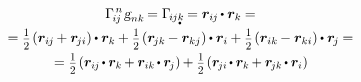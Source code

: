 \begin{otherlanguage}{russian}
\begin{multline}
\Gamma_{\hspace{-0.25ex}i\hspace{-0.1ex}j}^{\hspace{.25ex}n} \hspace{.16ex} \textsl{g}_{nk} \hspace{-0.24ex} = \Gamma_{\hspace{-0.25ex}i\hspace{-0.1ex}j\mathdotbelow{k}} \hspace{-0.2ex} = \bm{r}_{i\hspace{-0.1ex}j} \hspace{-0.2ex} \dotp \bm{r}_k \hspace{-0.1ex} = \\[-0.1em]
%
= \smalldisplaystyleonehalf \hspace{-0.2ex} \left( \bm{r}_{i\hspace{-0.1ex}j} \hspace{-0.16ex} + \bm{r}_{\hspace{-0.2ex}ji} \right) \hspace{-0.1ex} \dotp \bm{r}_k \hspace{-0.1ex}
+ \smalldisplaystyleonehalf \hspace{-0.2ex} \left( \bm{r}_{\hspace{-0.2ex}jk} \hspace{-0.16ex} - \bm{r}_{kj} \right) \hspace{-0.1ex} \dotp \bm{r}_i \hspace{-0.1ex}
+ \smalldisplaystyleonehalf \hspace{-0.2ex} \left( \bm{r}_{ik} \hspace{-0.16ex} - \bm{r}_{ki} \right) \hspace{-0.1ex} \dotp \bm{r}_{\hspace{-0.2ex}j} \hspace{-0.1ex} = \\[-0.12em]
%
= \smalldisplaystyleonehalf \hspace{-0.2ex} \left( \scalebox{0.96}[1]{$\bm{r}_{i\hspace{-0.1ex}j} \hspace{-0.2ex} \dotp \bm{r}_k \hspace{-0.16ex} + \bm{r}_{ik} \hspace{-0.2ex} \dotp \bm{r}_{\hspace{-0.2ex}j}$} \right) \hspace{-0.16ex}
+ \smalldisplaystyleonehalf \hspace{-0.2ex} \left( \scalebox{0.96}[1]{$\bm{r}_{\hspace{-0.2ex}ji} \hspace{-0.2ex} \dotp \bm{r}_k \hspace{-0.16ex} + \bm{r}_{\hspace{-0.2ex}jk} \hspace{-0.2ex} \dotp \bm{r}_i$} \right) \hspace{-0.16ex}

\end{multline}
\end{otherlanguage}
